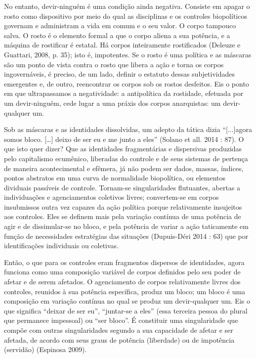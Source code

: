 No entanto, devir-ninguém é uma condição ainda
negativa. Consiste em apagar o rosto como dispositivo por meio do qual
as disciplinas e os controles biopolíticos governam e administram a vida
em comum e o seu valor. O corpo tampouco salva. O rosto é o elemento
formal a que o corpo aliena a sua potência, e a máquina de rostificar é
estatal. Há corpos inteiramente rostificados (Deleuze e Guattari, 2008,
p. 35); isto é, impotentes. Se o rosto é uma política e as máscaras são
um ponto de vista contra o rosto que libera a ação e torna os corpos
ingovernáveis, é preciso, de um lado, definir o estatuto dessas
subjetividades emergentes e, de outro, reencontrar os corpos sob os
rostos desfeitos. Eis o ponto em que ultrapassamos a negatividade: a
antipolítica da rostidade, efetuada por um devir-ninguém, cede lugar a
uma práxis dos corpos anarquistas: um devir-qualquer um.

Sob as máscaras e as identidades dissolvidas, um adepto da tática dizia
``{[}...{]}agora somos bloco. {[}\ldots{}{]} deixo de ser eu e me junto
a eles'' (Solano et all. 2014 : 87). O que isto quer dizer? Que as
identidades fragmentárias e dispersivas produzidas pelo capitalismo
ecumênico, liberadas do controle e de seus sistemas de pertença de
maneira acontecimental e efêmera, já não podem ser dados, massas,
índices, pontos abstratos em uma curva de normalidade biopolítica, ou
elementos dividuais passíveis de controle. Tornam-se singularidades
flutuantes, abertas a individuações e agenciamentos coletivos livres;
convertem-se em corpos insubmissos outra vez capazes da ação política
porque relativamente insujeitos aos controles. Eles se definem mais pela
variação contínua de uma potência de agir e de dissimular-se no bloco, e
pela potência de variar a ação taticamente em função de necessidades
estratégias das situações (Dupuis-Déri 2014 : 63) que por identificações
individuais ou coletivas.

Então, o que para os controles eram fragmentos dispersos de identidades,
agora funciona como uma composição variável de corpos definidos pelo seu
poder de afetar e de serem afetados. O agenciamento de corpos
relativamente livres dos controles, reunidos à sua potência específica,
produz um bloco; um bloco é uma composição em variação contínua no qual
se produz um devir-qualquer um. Eis o que significa ``deixar de ser
eu'', ``juntar-se a eles'' (essa terceira pessoa do plural que permanece
impessoal) ou ``ser bloco''. É constituir uma singularidade que compõe
com outras singularidades segundo a sua capacidade de afetar e ser
afetada, de acordo com seus graus de potência (liberdade) ou de
impotência (servidão) (Espinosa 2009).


